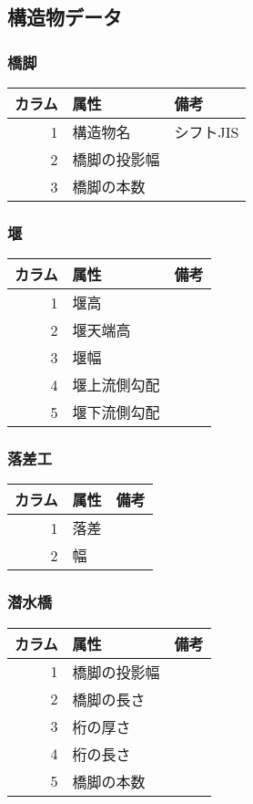 \documentclass{jsarticle}
\begin{document}
\hypertarget{ux69cbux9020ux7269ux30c7ux30fcux30bf}{%
\subsection{構造物データ}\label{ux69cbux9020ux7269ux30c7ux30fcux30bf}}

\hypertarget{ux6a4bux811a}{%
\subsubsection{橋脚}\label{ux6a4bux811a}}

\begin{longtable}[]{@{}rll@{}}
\toprule
カラム & 属性 & 備考\tabularnewline
\midrule
\endhead
1 & 構造物名 & シフトJIS\tabularnewline
2 & 橋脚の投影幅 &\tabularnewline
3 & 橋脚の本数 &\tabularnewline
\bottomrule
\end{longtable}

\hypertarget{ux5830}{%
\subsubsection{堰}\label{ux5830}}

\begin{longtable}[]{@{}rll@{}}
\toprule
カラム & 属性 & 備考\tabularnewline
\midrule
\endhead
1 & 堰高 &\tabularnewline
2 & 堰天端高 &\tabularnewline
3 & 堰幅 &\tabularnewline
4 & 堰上流側勾配 &\tabularnewline
5 & 堰下流側勾配 &\tabularnewline
\bottomrule
\end{longtable}

\hypertarget{ux843dux5deeux5de5}{%
\subsubsection{落差工}\label{ux843dux5deeux5de5}}

\begin{longtable}[]{@{}rll@{}}
\toprule
カラム & 属性 & 備考\tabularnewline
\midrule
\endhead
1 & 落差 &\tabularnewline
2 & 幅 &\tabularnewline
\bottomrule
\end{longtable}

\hypertarget{ux6f5cux6c34ux6a4b}{%
\subsubsection{潜水橋}\label{ux6f5cux6c34ux6a4b}}

\begin{longtable}[]{@{}rll@{}}
\toprule
カラム & 属性 & 備考\tabularnewline
\midrule
\endhead
1 & 橋脚の投影幅 &\tabularnewline
2 & 橋脚の長さ &\tabularnewline
3 & 桁の厚さ &\tabularnewline
4 & 桁の長さ &\tabularnewline
5 & 橋脚の本数 &\tabularnewline
\bottomrule
\end{longtable}
\end{document}
